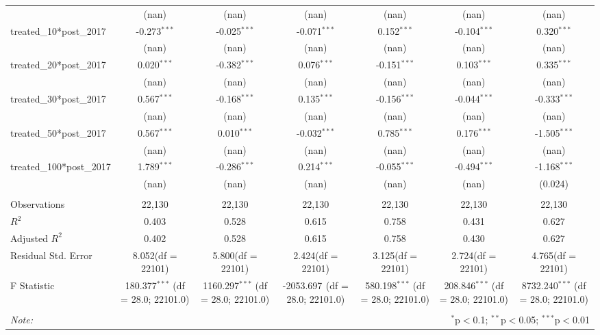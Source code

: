 \begin{table}[!htbp]
\begin{tabular}{@{\extracolsep{5pt}}lcccccc}
  & (nan) & (nan) & (nan) & (nan) & (nan) & (nan) \\
 treated_10*post_2017 & -0.273$^{***}$ & -0.025$^{***}$ & -0.071$^{***}$ & 0.152$^{***}$ & -0.104$^{***}$ & 0.320$^{***}$ \\
  & (nan) & (nan) & (nan) & (nan) & (nan) & (nan) \\
 treated_20*post_2017 & 0.020$^{***}$ & -0.382$^{***}$ & 0.076$^{***}$ & -0.151$^{***}$ & 0.103$^{***}$ & 0.335$^{***}$ \\
  & (nan) & (nan) & (nan) & (nan) & (nan) & (nan) \\
 treated_30*post_2017 & 0.567$^{***}$ & -0.168$^{***}$ & 0.135$^{***}$ & -0.156$^{***}$ & -0.044$^{***}$ & -0.333$^{***}$ \\
  & (nan) & (nan) & (nan) & (nan) & (nan) & (nan) \\
 treated_50*post_2017 & 0.567$^{***}$ & 0.010$^{***}$ & -0.032$^{***}$ & 0.785$^{***}$ & 0.176$^{***}$ & -1.505$^{***}$ \\
  & (nan) & (nan) & (nan) & (nan) & (nan) & (nan) \\
 treated_100*post_2017 & 1.789$^{***}$ & -0.286$^{***}$ & 0.214$^{***}$ & -0.055$^{***}$ & -0.494$^{***}$ & -1.168$^{***}$ \\
  & (nan) & (nan) & (nan) & (nan) & (nan) & (0.024) \\
\hline \\[-1.8ex]
 Observations & 22,130 & 22,130 & 22,130 & 22,130 & 22,130 & 22,130 \\
 $R^2$ & 0.403 & 0.528 & 0.615 & 0.758 & 0.431 & 0.627 \\
 Adjusted $R^2$ & 0.402 & 0.528 & 0.615 & 0.758 & 0.430 & 0.627 \\
 Residual Std. Error & 8.052(df = 22101) & 5.800(df = 22101) & 2.424(df = 22101) & 3.125(df = 22101) & 2.724(df = 22101) & 4.765(df = 22101)  \\
 F Statistic & 180.377$^{***}$ (df = 28.0; 22101.0) & 1160.297$^{***}$ (df = 28.0; 22101.0) & -2053.697$^{}$ (df = 28.0; 22101.0) & 580.198$^{***}$ (df = 28.0; 22101.0) & 208.846$^{***}$ (df = 28.0; 22101.0) & 8732.240$^{***}$ (df = 28.0; 22101.0) \\
\hline
\hline \\[-1.8ex]
\textit{Note:} & \multicolumn{6}{r}{$^{*}$p$<$0.1; $^{**}$p$<$0.05; $^{***}$p$<$0.01} \\
\end{tabular}
\end{table}